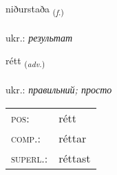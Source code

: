 \documentclass[frontgrid, backgrid]{flacards}\usepackage[]{graphicx}\usepackage[]{xcolor}
\begin{document}
\renewcommand{\flhead}{\vskip5pt \fboxsep=0pt {\small\bfseries\footnotesize Nafnorð | іменник}}
\renewcommand{\fcfoot}{\vskip5pt \fboxsep=0pt \hspace{2pt}{\small\bfseries\footnotesize 1K}}

\renewcommand{\blhead}{\vskip5pt {\small\bfseries\footnotesize Nafnorð | іменник }}
\renewcommand{\bcfoot}{\vskip5pt \hspace{2pt}{\small\bfseries\footnotesize 1K}}


{niðurstaða \small{\textsubscript{(\textit{f.})}} \\[1ex] %
 \\
ukr.: \emph{результат} \\  [2ex]
\renewcommand*{\arraystretch}{0.8}
}

\renewcommand{\flhead}{\vskip5pt \fboxsep=0pt {\small\bfseries\footnotesize Atviksorð | прислівник}}
\renewcommand{\fcfoot}{\vskip5pt \fboxsep=0pt \hspace{2pt}{\small\bfseries\footnotesize 1K}}

\renewcommand{\blhead}{\vskip5pt {\small\bfseries\footnotesize Atviksorð | прислівник }}
\renewcommand{\bcfoot}{\vskip5pt \hspace{2pt}{\small\bfseries\footnotesize 1K}}


{rétt \small{\textsubscript{(\textit{adv.})}} \\[1ex] %
\textphonetic{[rjɛht]} \\
ukr.: \emph{правильний; просто} \\  [2ex]
\renewcommand*{\arraystretch}{0.8}
\begin{tabular}{ll}
\textsc{pos}: & rétt \\ 
\textsc{comp.}: & réttar \\ 
\textsc{superl.}: & réttast \\
\end{tabular}
}
\end{document}
